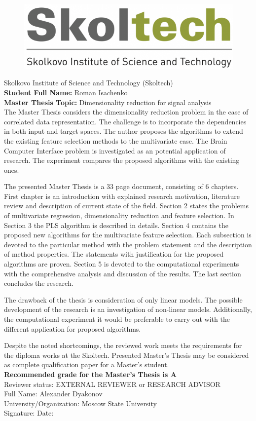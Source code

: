\documentclass[12pt,oneside]{article}
\theoremstyle{definition}
\begin{document}
	\thispagestyle{empty}
	\begin{figure}
		\centering
		\includegraphics[width=0.38\linewidth]{sk_logo}
	\end{figure}
	 Skolkovo Institute of Science and Technology (Skoltech) \\
	{\bf Student Full Name:} Roman Isachenko \\
	{\bf Master Thesis Topic:} Dimensionality reduction for signal analysis \\

The Master Thesis considers the dimensionality reduction problem in the case of correlated data representation. 
The challenge is to incorporate the dependencies in both input and target spaces.
The author proposes the algorithms to extend the existing feature selection methods to the multivariate case.
The Brain Computer Interface problem is investigated as an potential application of research. 
The experiment compares the proposed algorithms with the existing ones.

The presented Master Thesis is a 33 page document, consisting of 6 chapters.
First chapter is an introduction with explained research motivation, literature review and description of current state of the field. 
Section 2 states the problems of multivariate regression, dimensionality reduction and feature selection. 
In Section 3 the PLS algorithm is described in details. 
Section 4 contains the proposed new algorithms for the multivariate feature selection. 
Each subsection is devoted to the particular method with the problem statement and the description of method properties. 
The statements with justification for the proposed algorithms are proven.
Section 5 is devoted to the computational experiments with the comprehensive analysis and discussion of the results.
The last section concludes the research.

The drawback of the thesis is consideration of only linear models. 
The possible development of the research is an investigation of non-linear models. 
Additionally, the computational experiment it would be preferable to carry out with the different application for proposed algorithms. 

Despite the noted shortcomings, the reviewed work meets the requirements for the diploma works at the Skoltech.
Presented Master’s Thesis may be considered as complete qualification paper for a Master’s student. \\[4mm]
{\bf Recommended grade for the Master’s Thesis is A}\\[4mm]
Reviewer status:    EXTERNAL REVIEWER     or     RESEARCH ADVISOR\\[2mm]
Full Name: Alexander Dyakonov\\[2mm]
University/Organization: Moscow State University\\[4mm]
Signature: \hspace{7cm}Date:
\end{document}
